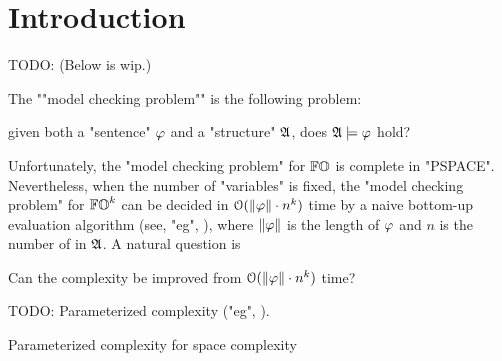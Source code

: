 \section{Introduction}\label{sec: introduction}
\begin{yoshiki}
    TODO: (Below is wip.)
\end{yoshiki}

The ""model checking problem"" is the following problem:
\begin{center}
given both a "sentence" $\fml$ and a "structure" $\struc$, does $\struc \models \fml$ hold?
\end{center}
Unfortunately, the "model checking problem" for $\mathbb{FO}$ is complete in "PSPACE".
Nevertheless, when the number of "variables" is fixed, the "model checking problem" for $\mathbb{FO}^{k}$ can be decided in $\mathcal{O}(\len{\fml} \cdot n^{k})$ time by a naive bottom-up evaluation algorithm (see, "eg", \cite[Proposition 3.1]{vardiComplexityBoundedvariableQueries1995}),
where $\len{\fml}$ is the length of $\fml$ and $n$ is the number of  in $\struc$.
A natural question is 
\begin{center}
    Can the complexity be improved from $\mathcal{O}(\len{\fml} \cdot n^{k})$ time?
\end{center}

\begin{yoshiki}
    TODO: Parameterized complexity ("eg", \cite{flumParameterizedComplexityTheory2006,flumFixedParameterTractabilityDefinability2001,flumModelCheckingProblemsBasis2005, frickComplexityFirstorderMonadic2004}).

    Parameterized complexity for space complexity \cite{chenParameterizedSpaceComplexity2019}
\end{yoshiki}

